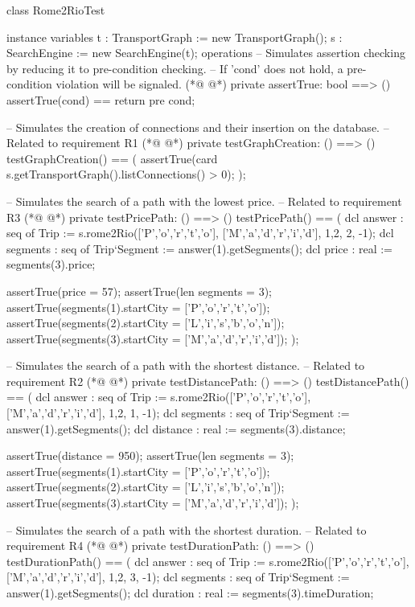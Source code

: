 \begin{vdmpp}[breaklines=true]
class Rome2RioTest

instance variables
 t : TransportGraph := new TransportGraph();
 s : SearchEngine := new SearchEngine(t);
operations
 -- Simulates assertion checking by reducing it to pre-condition checking.
 -- If 'cond' does not hold, a pre-condition violation will be signaled.
(*@
\label{assertTrue:9}
@*)
 private assertTrue: bool ==> ()
   assertTrue(cond) == return
  pre cond;

 -- Simulates the creation of connections and their insertion on the database.
 -- Related to requirement R1
(*@
\label{testGraphCreation:15}
@*)
  private testGraphCreation: () ==> ()
  testGraphCreation() == (
   assertTrue(card s.getTransportGraph().listConnections() > 0);
  );
    
  -- Simulates the search of a path with the lowest price.
 -- Related to requirement R3
(*@
\label{testPricePath:22}
@*)
  private testPricePath: () ==> ()
  testPricePath() == (
    dcl answer : seq of Trip := s.rome2Rio(['P','o','r','t','o'], ['M','a','d','r','i','d'], {1,2}, 2, -1);
    dcl segments : seq of Trip`Segment := answer(1).getSegments();
    dcl price : real := segments(3).price;
    
    assertTrue(price = 57);
    assertTrue(len segments = 3);
    assertTrue(segments(1).startCity = ['P','o','r','t','o']);
    assertTrue(segments(2).startCity = ['L','i','s','b','o','n']);
    assertTrue(segments(3).startCity = ['M','a','d','r','i','d']);
  );
    
  -- Simulates the search of a path with the shortest distance.
 -- Related to requirement R2
(*@
\label{testDistancePath:37}
@*)
  private testDistancePath: () ==> ()
  testDistancePath() == (
    dcl answer : seq of Trip := s.rome2Rio(['P','o','r','t','o'], ['M','a','d','r','i','d'], {1,2}, 1, -1);
    dcl segments : seq of Trip`Segment := answer(1).getSegments();
    dcl distance : real := segments(3).distance;
    
    assertTrue(distance = 950);
    assertTrue(len segments = 3);
    assertTrue(segments(1).startCity = ['P','o','r','t','o']);
    assertTrue(segments(2).startCity = ['L','i','s','b','o','n']);
    assertTrue(segments(3).startCity = ['M','a','d','r','i','d']);
  );
  
  -- Simulates the search of a path with the shortest duration.
 -- Related to requirement R4
(*@
\label{testDurationPath:52}
@*)
  private testDurationPath: () ==> ()
  testDurationPath() == (
    dcl answer : seq of Trip := s.rome2Rio(['P','o','r','t','o'], ['M','a','d','r','i','d'], {1,2}, 3, -1);
    dcl segments : seq of Trip`Segment := answer(1).getSegments();
    dcl duration : real := segments(3).timeDuration;
      

\end{vdmpp}
